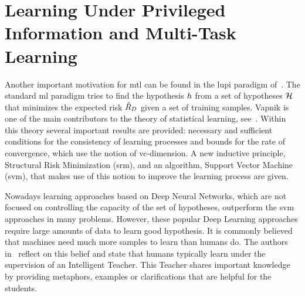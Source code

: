 \section{Learning Under Privileged Information and Multi-Task Learning}\label{sec:ch3_lupi}
Another important motivation for \acrshort{mtl} can be found in the \acrfull{lupi} paradigm of~\cite{VapnikI15a}.
The standard \acrshort{ml} paradigm tries to find the hypothesis $h$ from a set of hypotheses $\mathcal{H}$ that minimizes the expected risk $\hat{R}_{D}$ given a set of training samples.
Vapnik is one of the main contributors to the theory of statistical learning, see~\cite{Vapnik00}. Within this theory several important results are provided: necessary and sufficient conditions for the consistency of learning processes and bounds for the rate of convergence, which use the notion of \acrshort{vc}-dimension. A new inductive principle, Structural Risk Minimization (\acrshort{srm}), and an algorithm, Support Vector Machine (\acrshort{svm}), that makes use of this notion to improve the learning process are given.

Nowadays learning approaches based on Deep Neural Networks, which are not focused on controlling the capacity of the set of hypotheses, outperform the \acrshort{svm} approaches in many problems. However, these popular Deep Learning approaches require large amounts of data to learn good hypothesis.
It is commonly believed that machines need much more samples to learn than humans do. The authors in~\citet{VapnikV09, VapnikI15a} reflect on this belief and state that humans typically learn under the supervision of an Intelligent Teacher.
This Teacher shares important knowledge by providing metaphors, examples or clarifications that are helpful for the students.



